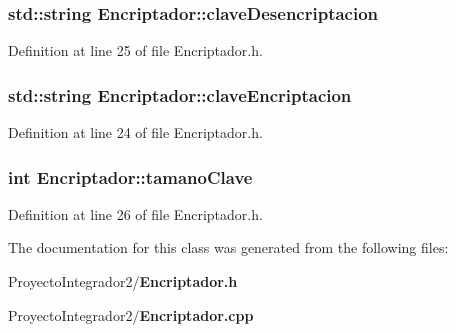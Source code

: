 \subsubsection[{clave\-Desencriptacion}]{\setlength{\rightskip}{0pt plus 5cm}std\-::string Encriptador\-::clave\-Desencriptacion\hspace{0.3cm}{\ttfamily [private]}}\label{class_encriptador_a70a589e464dee2e417bb14a87cf458ca}


Definition at line 25 of file Encriptador.\-h.

\subsubsection[{clave\-Encriptacion}]{\setlength{\rightskip}{0pt plus 5cm}std\-::string Encriptador\-::clave\-Encriptacion\hspace{0.3cm}{\ttfamily [private]}}\label{class_encriptador_a2556c08307108e435116ae4cffbd9ef8}


Definition at line 24 of file Encriptador.\-h.

\subsubsection[{tamano\-Clave}]{\setlength{\rightskip}{0pt plus 5cm}int Encriptador\-::tamano\-Clave\hspace{0.3cm}{\ttfamily [private]}}\label{class_encriptador_a4fb1a20c261b9a3aa7a975af581969a5}


Definition at line 26 of file Encriptador.\-h.



The documentation for this class was generated from the following files\-:\begin{DoxyCompactItemize}
\item 
Proyecto\-Integrador2/{\bf Encriptador.\-h}\item 
Proyecto\-Integrador2/{\bf Encriptador.\-cpp}\end{DoxyCompactItemize}
